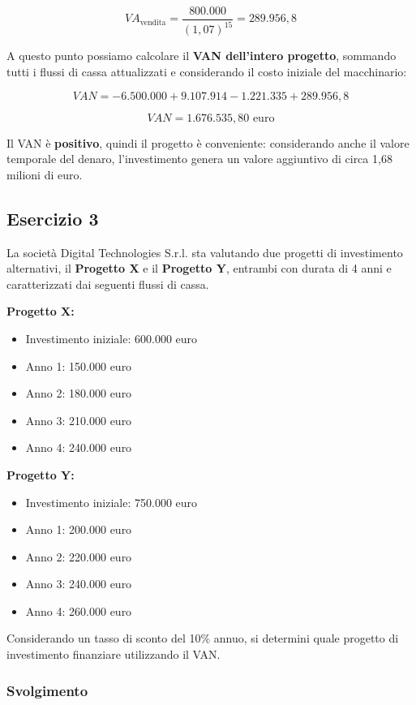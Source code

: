 \[
VA_{\text{vendita}}
=
\frac{800.000}{(1,07)^{15}}
=
289.956,8
\]

\noindent A questo punto possiamo calcolare il \textbf{VAN dell'intero progetto},
sommando tutti i flussi di cassa attualizzati e considerando il costo iniziale
del macchinario:

\[
VAN
=
-6.500.000
+9.107.914
-1.221.335
+289.956,8
\]

\[
\boxed{VAN=1.676.535,80\text{ euro}}
\]

\noindent Il VAN è \textbf{positivo}, quindi il progetto è conveniente:
considerando anche il valore temporale del denaro, l'investimento genera un
valore aggiuntivo di circa 1,68 milioni di euro.
\newpage
\subsection{Esercizio 3}

\noindent La società Digital Technologies S.r.l. sta valutando due progetti di
investimento alternativi, il \textbf{Progetto X} e il \textbf{Progetto Y},
entrambi con durata di 4 anni e caratterizzati dai seguenti flussi di cassa.

\medskip
\noindent\textbf{Progetto X:}
\begin{itemize}
    \item Investimento iniziale: 600.000 euro
    \item Anno 1: 150.000 euro
    \item Anno 2: 180.000 euro
    \item Anno 3: 210.000 euro
    \item Anno 4: 240.000 euro
\end{itemize}

\noindent\textbf{Progetto Y:}
\begin{itemize}
    \item Investimento iniziale: 750.000 euro
    \item Anno 1: 200.000 euro
    \item Anno 2: 220.000 euro
    \item Anno 3: 240.000 euro
    \item Anno 4: 260.000 euro
\end{itemize}

\noindent Considerando un tasso di sconto del 10\% annuo, si determini quale
progetto di investimento finanziare utilizzando il VAN.
\subsubsection*{Svolgimento}

